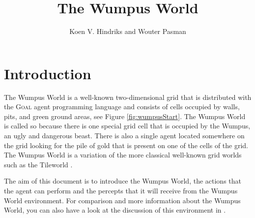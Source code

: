 \documentclass{article}
\newcommand{\GOAL}{\textsc{Goal} }
\begin{document}
\title{The Wumpus World}
\author{Koen V. Hindriks and Wouter Pasman}
\maketitle

%
%
%
\section{Introduction}
%
The Wumpus World is a well-known two-dimensional grid that is
distributed with the \GOAL agent programming language and consists of cells
occupied by walls, pits, and green ground areas, see Figure
\ref{fig:wumpusStart}. The Wumpus World is called so because there is one
special grid cell that is occupied by the Wumpus, an ugly and dangerous beast.
There is also a single agent located somewhere on the grid looking for the pile
of gold that is present on one of the cells of the grid.
The Wumpus World is a variation of the more classical well-known grid
worlds such as the Tileworld \cite{Pol90}.

The aim of this document is to introduce the Wumpus World, the actions that
the agent can perform and the percepts that it will receive from the Wumpus World environment. For
comparison and more information about the Wumpus World, you can also have a look
at the discussion of this environment in \cite{Rus03}.

\begin{figure}[h]
\centering
{}
\end{figure}
\end{document}
